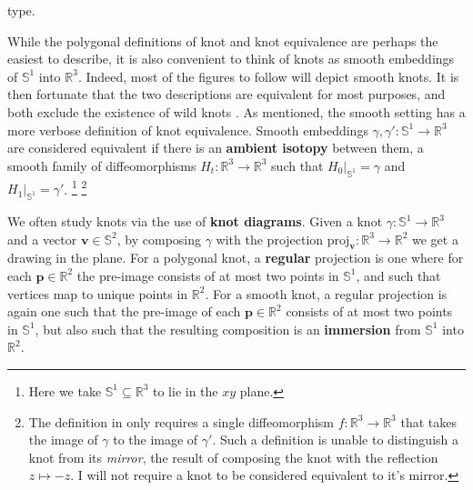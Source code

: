     type.
    \par\hfill\par
    While the polygonal definitions of knot and knot equivalence are perhaps
    the easiest to describe, it is also convenient to think of knots as smooth
    embeddings of $\mathbb{S}^{1}$ into $\mathbb{R}^{3}$. Indeed, most of the
    figures to follow will depict smooth knots. It is then fortunate that the
    two descriptions are equivalent for most purposes, and both exclude the
    existence of wild knots \cite[p.~147]{CrowellFoxKnotTheory}. As mentioned,
    the smooth setting has a more verbose definition of knot equivalence.
    Smooth embeddings $\gamma,\gamma':\mathbb{S}^{1}\rightarrow\mathbb{R}^{3}$
    are considered equivalent if there is an \textbf{ambient isotopy}
    between them, a smooth family of diffeomorphisms
    $H_{t}:\mathbb{R}^{3}\rightarrow\mathbb{R}^{3}$ such that
    $H_{0}|_{\mathbb{S}^{1}}=\gamma$ and $H_{1}|_{\mathbb{S}^{1}}=\gamma'$.%
    \footnote{%
        Here we take $\mathbb{S}^{1}\subseteq\mathbb{R}^{3}$
        to lie in the $xy$ plane.
    }
    \footnote{%
        The definition in \cite[p.~4]{CrowellFoxKnotTheory} only requires a
        single diffeomorphism $f:\mathbb{R}^{3}\rightarrow\mathbb{R}^{3}$ that
        takes the image of $\gamma$ to the image of $\gamma'$. Such a
        definition is unable to distinguish a knot from its \textit{mirror},
        the result of composing the knot with the reflection $z\mapsto{-z}$.
        I will not require a knot to be considered equivalent to it's mirror.
    }
    \par\hfill\par
    We often study knots via the use of \textbf{knot diagrams}. Given a knot
    $\gamma:\mathbb{S}^{1}\rightarrow\mathbb{R}^{3}$ and a vector
    $\mathbf{v}\in\mathbb{S}^{2}$, by composing $\gamma$ with the projection
    $\textrm{proj}_{\mathbf{v}}:\mathbb{R}^{3}\rightarrow\mathbb{R}^{2}$ we get
    a drawing in the plane. For a polygonal knot, a \textbf{regular} projection
    is one where for each $\mathbf{p}\in\mathbb{R}^{2}$ the pre-image consists
    of at most two points in $\mathbb{S}^{1}$, and such that vertices map to
    unique points in $\mathbb{R}^{2}$. For a smooth knot, a
    regular projection is again one such that the pre-image of each
    $\mathbf{p}\in\mathbb{R}^{2}$ consists of at most two points in
    $\mathbb{S}^{1}$, but also such that the resulting composition is an
    \textbf{immersion} from $\mathbb{S}^{1}$ into $\mathbb{R}^{2}$.
    \par\hfill\par
